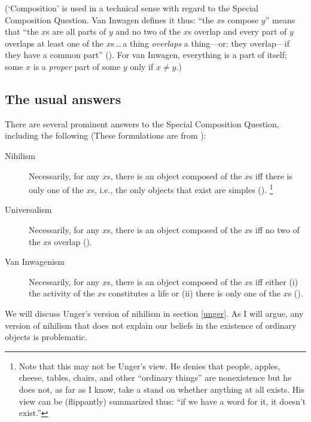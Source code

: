 \documentclass[11pt]{article}
\begin{document}
\begin{spacing}{1.5}
(`Composition' is used in a technical sense with regard to the Special
Composition Question.  Van Inwagen defines it thus: ``the $x$s compose
$y$'' means that ``the $x$s are all parts of $y$ and no two of the
$x$s overlap and every part of $y$ overlaps at least one of the
$x$s\,\ldots\,a thing {\em overlaps} a thing---or: they overlap---if
they have a common part'' (\citeyear[29]{inwagen1995}).  For van
Inwagen, everything is a part of itself; some $x$ is a {\em proper}
part of some $y$ only if $x \neq y$.)

\subsection{The usual answers}
\label{scq-ans}
There are several prominent answers to the Special Composition
Question, including the following (These formulations are from
\citet{markosian1998a}):
\begin{description}
	\item[Nihilism] Necessarily, for any $x$s, there is an object
          composed of the $x$s iff there is only one of the $x$s,
          i.e., the only objects that exist are
          simples (\citeyear[219]{markosian1998a}).
	\footnote{\label{flip} Note that this may not be Unger's view.
          He denies that people, apples, cheese, tables, chairs, and
          other ``ordinary things'' are nonexistence but he does not,
          as far as I know, take a stand on whether anything at all
          exists.  His view can be (flippantly) summarized thus: ``if
          we have a word for it, it doesn't exist.''}
	\item[Universalism] Necessarily, for any $x$s, there is an
          object composed of the $x$s iff no two of the $x$s
          overlap (\citeyear[227]{markosian1998a}).
	\item[Van Inwagenism] Necessarily, for any $x$s, there is an
          object composed of the $x$s iff either (i) the activity of
          the $x$s constitutes a life or (ii) there is only one of the
          $x$s (\citeyear[221]{markosian1998a}).
\end{description}

We will discuss Unger's version of nihilism in section \ref{unger}.
As I will argue, any version of nihilism that does not explain our
beliefs in the existence of ordinary objects is problematic.


\end{spacing}
\end{document}
